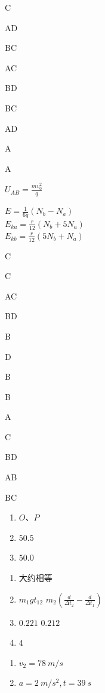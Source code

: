 \item C
\item AD
\item BC
\item AC
\item BD
\item BC
\item AD
\item A
\item A
\item $U _ { A B } = \frac { m v _ { 0 } ^ { 2 } } { q }$
\item $E = \frac { 1 } { 6 q } \left ( N _ { b } - N _ { a } \right )$\\ $E _ { k a } = \frac { r } { 12 } \left ( N _ { b } + 5 N _ { a } \right )$\\ $E _ { k b } = \frac { r } { 12 } \left ( 5 N _ { b } + N _ { a } \right )$
\item C
\item C
\item AC
\item BD
\item B
\item D
\item B
\item B
\item A
\item C
\item BD
\item AB
\item BC
\item \begin {enumerate} \item $ O $、$ P $ \item {} \quad $ 50.5 $ \item $ 50.0 $ \end {enumerate}
\item \begin {enumerate} \item [(1)] 大约相等 \item [(5)] $m_{1} g t_{12}$ \quad $m_{2}\left (\frac {d}{\Delta t_{2}}-\frac {d}{\Delta t_{1}}\right )$ \item [(6)] $ 0.221 $ \quad $ 0.212 $ \item [(7)] $ 4 $ \end {enumerate}
\item \begin {enumerate} \item $v_{2}=78 \ m/s $ \item $a=2 \ m/s^{2} , t=39 \ s $ \end {enumerate}
